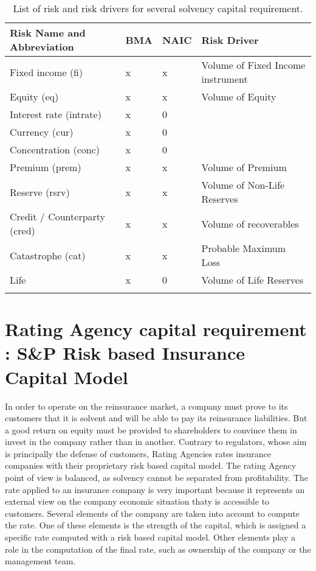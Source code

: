 \begin{table}
\centering
\begin{tabular}{|l|l|l|l|}
\hline
   \textbf{Risk Name and Abbreviation} & \textbf{BMA} & \textbf{NAIC} & \textbf{Risk Driver} \\ \hline \hline
   Fixed income (fi) & x & x & Volume of Fixed Income instrument\\ \hline
   Equity (eq) & x & x & Volume of Equity \\ \hline
   Interest rate (intrate) & x & 0 & \\ \hline
   Currency (cur) & x & 0 & \\ \hline
   Concentration (conc) & x & 0 & \\ \hline
   Premium (prem) & x & x & Volume of Premium \\ \hline
   Reserve (rsrv) & x & x &  Volume of Non-Life Reserves \\ \hline
   Credit / Counterparty (cred) & x & x & Volume of recoverables\\ \hline
   Catastrophe (cat) & x & x & Probable Maximum Loss\\ \hline
   Life & x & 0 & Volume of Life Reserves\\ \hline
   \label{t:RISK_LIST}
\end{tabular}
   \caption{List of risk and risk drivers for several solvency capital requirement.}
\end{table}




\section{Rating Agency capital requirement : S\&P Risk based Insurance Capital Model}

In order to operate on the reinsurance market, a company must prove to its customers that it is solvent and will be able to pay its reinsurance liabilities. But a good return on equity must be provided to shareholders to convince them in invest in the company rather than in another. Contrary to regulators, whose aim is principally the defense of customers, Rating Agencies rates insurance companies with their proprietary risk based capital model. The rating Agency point of view is balanced, as solvency cannot be separated from profitability. 
The rate applied to an insurance company is very important because it represents an external view on the company economic situation thaty is accessible to customers.
Several elements of the company are taken into account to compute the rate. One of these elements is the strength of the capital, which is assigned a specific rate computed with a risk based capital model. Other elements play a role in the computation of the final rate, such as ownership of the company or the management team. 


